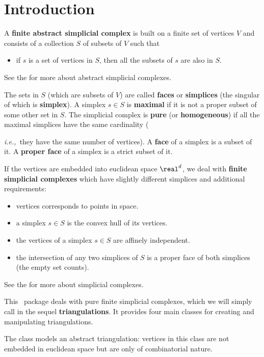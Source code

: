 {

\section{Introduction\label{triangulation:intro}}

A \textbf{finite abstract simplicial complex} is built on a finite set of
vertices $V$ and consists of a collection $S$ of subsets of $V$ such that
\begin{itemize}
\item if $s$ is a set of vertices in $S$, then all the subsets of $s$ are also
in $S$.
\end{itemize}
See the
 for more about abstract simplicial complexes.

The sets in $S$ (which are subsets of $V$) are called
\textbf{faces} or \textbf{simplices} (the
singular of which is \textbf{simplex}).
%
A simplex $s\in S$ is \textbf{maximal} if it is not a proper subset of some other
set in $S$. The simplicial complex is \textbf{pure} (or \textbf{homogeneous})
if all the maximal simplices have the same cardinality ({\emph{i.e.,}\ they have the same
number of vertices). A \textbf{face} of a simplex is a subset of it. A
\textbf{proper face} of a simplex is a strict subset of it.

If the vertices are embedded into euclidean space $\real^d$, we deal with
\textbf{finite simplicial complexes} which have slightly different simplices
and additional requirements:
\begin{itemize}
\item vertices corresponds to points in space.
\item a simplex $s\in S$ is the convex hull of its vertices.
\item the vertices of a simplex $s\in S$ are affinely independent.
\item the intersection of any two simplices of $S$ is a proper face of both
simplices (the empty set counts).
\end{itemize}
See the  for more about simplicial complexes.

This \cgal\ package deals with pure finite simplicial complexes, which
we will simply call in the sequel \textbf{triangulations}. It provides four main classes
for creating and manipulating triangulations.

The class  models an abstract triangulation: vertices in this
class are not embedded in euclidean space but are only of combinatorial
nature.

}}
